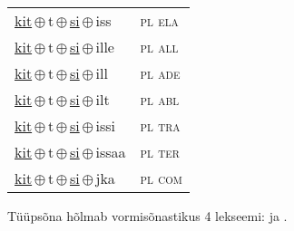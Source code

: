 \begin{minipage}{\textwidth}
\begin{sideways}
\begin{tabular}{l l}
\underline{kit}\,$\oplus$\,t\,$\oplus$\,\underline{si}\,$\oplus$\,iss & \textsc{ pl ela } \\
\underline{kit}\,$\oplus$\,t\,$\oplus$\,\underline{si}\,$\oplus$\,ille & \textsc{ pl all } \\
\underline{kit}\,$\oplus$\,t\,$\oplus$\,\underline{si}\,$\oplus$\,ill & \textsc{ pl ade } \\
\underline{kit}\,$\oplus$\,t\,$\oplus$\,\underline{si}\,$\oplus$\,ilt & \textsc{ pl abl } \\
\underline{kit}\,$\oplus$\,t\,$\oplus$\,\underline{si}\,$\oplus$\,issi & \textsc{ pl tra } \\
\underline{kit}\,$\oplus$\,t\,$\oplus$\,\underline{si}\,$\oplus$\,issaa & \textsc{ pl ter } \\
\underline{kit}\,$\oplus$\,t\,$\oplus$\,\underline{si}\,$\oplus$\,jka & \textsc{ pl com } \\
\end{tabular}
\end{sideways}
\label{tab:tüüpsõnamall-kittsi}

\end{minipage}

 
\vspace{1em}
\noindent Tüüpsõna hõlmab vormisõnastikus 4 lekseemi:  ja .
